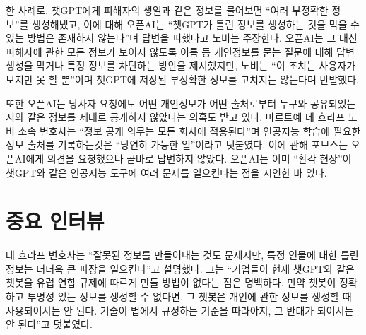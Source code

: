 \documentclass{translation}
\begin{document}
한 사례로, 챗GPT에게 피해자의 생일과 같은 정보를 물어보면 ``여러 부정확한 정보''를 생성해냈고, 이에 대해 오픈AI는 ``챗GPT가 틀린 정보를 생성하는 것을 막을 수 있는 방법은 존재하지 않는다''며 답변을 피했다고 노비는 주장한다.
오픈AI는 그 대신 피해자에 관한 모든 정보가 보이지 않도록 이름 등 개인정보를 묻는 질문에 대해 답변 생성을 막거나 특정 정보를 차단하는 방안을 제시했지만, 노비는 ``이 조치는 사용자가 보지만 못 할 뿐''이며 챗GPT에 저장된 부정확한 정보를 고치지는 않는다며 반발했다.
% 

또한 오픈AI는 당사자 요청에도 어떤 개인정보가 어떤 출처로부터 누구와 공유되었는지와 같은 정보를 제대로 공개하지 않았다는 의혹도 받고 있다.
마르트예 데 흐라프 노비 소속 변호사는 ``정보 공개 의무는 모든 회사에 적용된다''며 인공지능 학습에 필요한 정보 출처를 기록하는것은 ``당연히 가능한 일''이라고 덧붙였다.
이에 관해 포브스는 오픈AI에게 의견을 요청했으나 곧바로 답변하지 않았다.
오픈AI는 이미 ``환각 현상''이 챗GPT와 같은 인공지능 도구에 여러 문제를 일으킨다는 점을 시인한 바 있다.
% 

\section{중요 인터뷰}
% 

데 흐라프 변호사는 ``잘못된 정보를 만들어내는 것도 문제지만, 특정 인물에 대한 틀린 정보는 더더욱 큰 파장을 일으킨다''고 설명했다.
그는 ``기업들이 현재 챗GPT와 같은 챗봇을 유럽 연합 규제에 따르게 만들 방법이 없다는 점은 명백하다. 만약 챗봇이 정확하고 투명성 있는 정보를 생성할 수 없다면, 그 챗봇은 개인에 관한 정보를 생성할 때 사용되어서는 안 된다. 기술이 법에서 규정하는 기준을 따라야지, 그 반대가 되어서는 안 된다''고 덧붙였다.
% 
\end{document}
